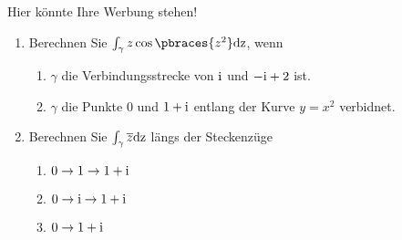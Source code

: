 \begin{exercise}
    Hier könnte Ihre Werbung stehen!
    \begin{enumerate}[label = (\roman*)]
        \item Berechnen Sie $\int_\gamma z \cos\pbraces{z^2} \rm{d}z$, wenn
        \begin{enumerate}[label = (\arabic*)]
            \item $\gamma$ die Verbindungsstrecke von $\rm{i}$ und $-\rm{i} + 2$ ist.
            \item $\gamma$ die Punkte $0$ und $1 + \rm{i}$ entlang der Kurve $y = x^2$ verbidnet.
        \end{enumerate}
        \item Berechnen Sie $\int_\gamma \overline{z} \rm{d}z$ längs der Steckenzüge
        \begin{enumerate}[label = (\alph*)]
            \item $0 \to 1 \to 1 + \rm{i}$
            \item $0 \to \rm{i} \to 1 + \rm{i}$
            \item $0 \to 1 + \rm{i}$
        \end{enumerate}
    \end{enumerate}
\end{exercise}

